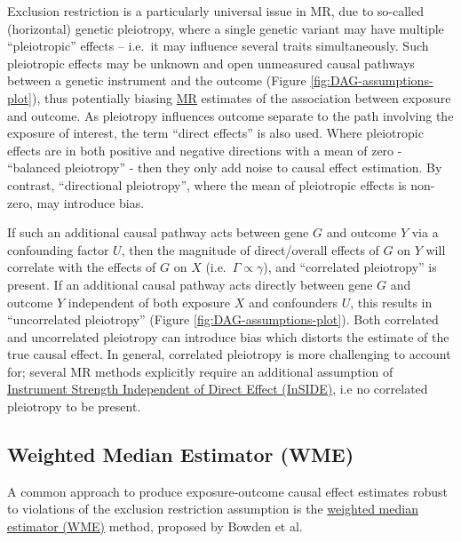 \documentclass[
]{article}
\begin{document}
Exclusion restriction is a particularly universal issue in MR, due to so-called (horizontal) genetic pleiotropy, where a single genetic variant may have multiple ``pleiotropic'' effects -- i.e.~it may influence several traits simultaneously. Such pleiotropic effects may be unknown and open unmeasured causal pathways between a genetic instrument and the outcome (Figure \ref{fig:DAG-assumptions-plot}), thus potentially biasing \hyperref[acronyms_MR]{MR} estimates of the association between exposure and outcome. As pleiotropy influences outcome separate to the path involving the exposure of interest, the term ``direct effects'' is also used\textsuperscript{}. Where pleiotropic effects are in both positive and negative directions with a mean of zero - ``balanced pleiotropy'' - then they only add noise to causal effect estimation\textsuperscript{}. By contrast, ``directional pleiotropy'', where the mean of pleiotropic effects is non-zero, may introduce bias\textsuperscript{}.

If such an additional causal pathway acts between gene \(G\) and outcome \(Y\) via a confounding factor \(U\), then the magnitude of direct/overall effects of \(G\) on \(Y\) will correlate with the effects of \(G\) on \(X\) (i.e.~\(\Gamma \propto \gamma\)), and ``correlated pleiotropy'' is present. If an additional causal pathway acts directly between gene \(G\) and outcome \(Y\) independent of both exposure \(X\) and confounders \(U\), this results in ``uncorrelated pleiotropy'' (Figure \ref{fig:DAG-assumptions-plot}). Both correlated and uncorrelated pleiotropy can introduce bias which distorts the estimate of the true causal effect. In general, correlated pleiotropy is more challenging to account for; several MR methods explicitly require an additional assumption of \hyperref[acronyms_InSIDE]{Instrument Strength Independent of Direct Effect (InSIDE)}, i.e no correlated pleiotropy to be present\textsuperscript{}.

\subsection{Weighted Median Estimator (WME)}\label{weighted-median-estimator-wme}

A common approach to produce exposure-outcome causal effect estimates robust to violations of the exclusion restriction assumption is the \hyperref[acronyms_WME]{weighted median estimator (WME)} method, proposed by Bowden et al\textsuperscript{}.
\end{document}
